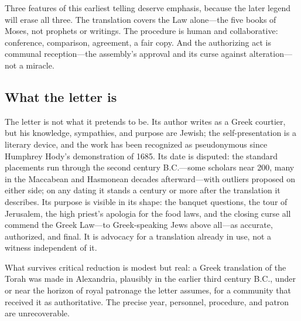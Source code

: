 Three features of this earliest telling deserve emphasis, because the later
legend will erase all three. The translation covers the Law
alone---the five books of Moses, not prophets or writings. The procedure is
human and collaborative: conference, comparison, agreement, a fair copy. And
the authorizing act is communal reception---the assembly's approval and its
curse against alteration---not a miracle.

\subsection{What the letter is}

The letter is not what it pretends to be. Its author writes as a Greek
courtier, but his knowledge, sympathies, and purpose are Jewish; the
self-presentation is a literary device, and the work has been recognized as
pseudonymous since Humphrey Hody's demonstration of 1685. Its date is
disputed: the standard placements run through the second century B.C.---some
scholars near 200, many in the Maccabean and Hasmonean decades
afterward---with outliers proposed on either side; on any dating it stands a
century or more after the translation it
describes. Its purpose is visible in its shape: the banquet
questions, the tour of Jerusalem, the high priest's apologia for the food
laws, and the closing curse all commend the Greek Law---to Greek-speaking
Jews above all---as accurate, authorized, and final. It is advocacy for a
translation already in use, not a witness independent of it.


What survives critical reduction is modest but real: a Greek translation of
the Torah was made in Alexandria, plausibly in the earlier third century
B.C., under or near the horizon of royal patronage the letter assumes, for a
community that received it as authoritative. The precise year, personnel,
procedure, and patron are unrecoverable.
